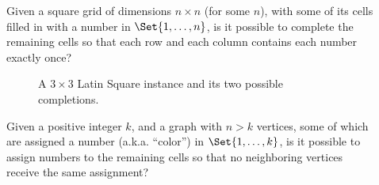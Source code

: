 \begin{description}

\item[] Given a square grid of dimensions \(n×n\) (for
  some \(n\)), with some of its cells filled in with a number in
  \(\Set{1,\dotsc,n}\), is it possible to complete the remaining cells so that
  each row and each column contains each number exactly once?

  \begin{figure}[H]
    \begin{center}

      \caption{A \(3×3\) Latin Square instance and its two possible
      completions.}

      \label{fig:background.latin-square-example}

    \end{center}
  \end{figure}

\item[] Given a positive integer \(k\), and a graph
  with \(n>k\) vertices, some of which are assigned a number (a.k.a. ``color'')
  in \(\Set{1,\dotsc,k}\), is it possible to assign numbers to the remaining
  cells so that no neighboring vertices receive the same assignment?






\end{description}

